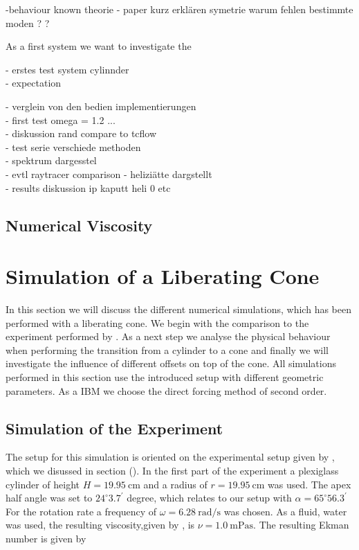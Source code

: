 -behaviour known theorie
- paper kurz erklären symetrie warum fehlen bestimmte moden ? ?

As a first system we want to investigate the

- erstes test system cylinnder\\
- expectation

- verglein von den bedien implementierungen\\
- first test omega = 1.2 ...\\
- diskussion rand compare to tcflow \\
- test serie verschiede methoden\\
- spektrum dargesstel\\
- evtl raytracer  comparison
- heliziätte dargstellt\\
- results diskussion ip kaputt heli 0 etc \\
\subsection{Numerical Viscosity}

\newpage

\section{Simulation of a Liberating Cone}

In this section we will discuss the different numerical simulations, which has been performed
with a liberating cone. We begin with the comparison to the experiment performed by \citep{Beardsley1970}.
As a next step we analyse the physical behaviour when performing the transition from a cylinder
to a cone and finally  we will investigate the influence of different offsets on top of the cone.
All simulations performed in this section use the introduced setup with different geometric parameters.
As a IBM we choose the direct forcing  method of second order.

\subsection{Simulation of the Experiment}

The setup for this simulation is oriented on the experimental setup given by \citep{Beardsley1970}, which
we disussed in section ().
In the first part of the experiment a plexiglass cylinder of height $H=\SI{19.95}{\centi\meter}$ and a radius of
$r=\SI{19.95}{\centi\meter}$ was used. The apex half angle was set to $24^{\circ}3.7^{\prime}$ degree,
which relates to our setup with $\alpha=65^{\circ}56.3^{\prime}$
For the rotation rate a frequency of $\omega =\SI{6.28}{\radian\per\second}$ was chosen.
As a fluid, water was used, the resulting viscosity,given by \citep{tipler2003}, is $\nu = \SI{1.0}{\milli\pascal\second}$.
The resulting Ekman number is given by

